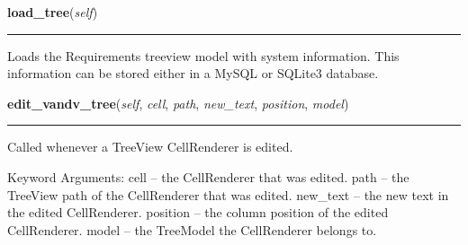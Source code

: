     \vspace{0.5ex}

\hspace{.8\funcindent}\begin{boxedminipage}{\funcwidth}

    \raggedright \textbf{load\_tree}(\textit{self})

    \vspace{-1.5ex}

    \rule{\textwidth}{0.5\fboxrule}
\setlength{\parskip}{2ex}
    Loads the Requirements treeview model with system information. This 
    information can be stored either in a MySQL or SQLite3 database.

\setlength{\parskip}{1ex}
    \end{boxedminipage}

    \label{reliafree:requirement:Requirement:edit_vandv_tree}

    \vspace{0.5ex}

\hspace{.8\funcindent}\begin{boxedminipage}{\funcwidth}

    \raggedright \textbf{edit\_vandv\_tree}(\textit{self}, \textit{cell}, \textit{path}, \textit{new\_text}, \textit{position}, \textit{model})

    \vspace{-1.5ex}

    \rule{\textwidth}{0.5\fboxrule}
\setlength{\parskip}{2ex}
    Called whenever a TreeView CellRenderer is edited.

    Keyword Arguments: cell     -- the CellRenderer that was edited. path
    -- the TreeView path of the CellRenderer that was edited. new\_text -- 
    the new text in the edited CellRenderer. position -- the column 
    position of the edited CellRenderer. model    -- the TreeModel the 
    CellRenderer belongs to.

\setlength{\parskip}{1ex}
    \end{boxedminipage}

    \label{reliafree:requirement:Requirement:add_requirement}

